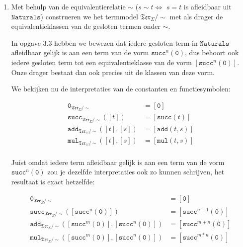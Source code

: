 \documentclass[a4paper,11pt]{article}
\begin{document}
\begin{enumerate}

\item %

Met behulp van de equivalentierelatie $\sim$ ($s \sim t \Leftrightarrow$ $s =
t$ is afleidbaar uit $\texttt{Naturals}$) construeren we het termmodel
$\mathfrak{Ter}_{\Sigma}/\sim$ met als drager de equivalentieklassen van de
gesloten termen onder $\sim$.

In opgave 3.3 hebben we bewezen dat iedere gesloten term in
$\texttt{Naturals}$ afleidbaar gelijk is aan een term van de vorm
$\texttt{succ}^{n}(\texttt{0})$, dus behoort ook iedere gesloten term tot een
equivalentieklasse van de vorm $[\texttt{succ}^{n}(\texttt{0})]$. Onze drager
bestaat dan ook precies uit de klassen van deze vorm.

We bekijken nu de interpretaties van de constanten en functiesymbolen:

\begin{align*}
\texttt{0}_{\mathfrak{Ter}_{\Sigma}/\sim}            &= [\texttt{0}] \\
\texttt{succ}_{\mathfrak{Ter}_{\Sigma}/\sim}([t])    &= [\texttt{succ}(t)] \\
\texttt{add}_{\mathfrak{Ter}_{\Sigma}/\sim}([t],[s]) &= [\texttt{add}(t,s)] \\
\texttt{mul}_{\mathfrak{Ter}_{\Sigma}/\sim}([t],[s]) &= [\texttt{mul}(t,s)] \\
\end{align*}

Juist omdat iedere term afleidbaar gelijk is aan een term van de vorm
$\texttt{succ}^{n}(\texttt{0})$ zou je dezelfde interpretaties ook zo kunnen
schrijven, het resultaat is exact hetzelfde:

\begin{align*}
\texttt{0}_{\mathfrak{Ter}_{\Sigma}/\sim}
  &= [\texttt{0}] \\
\texttt{succ}_{\mathfrak{Ter}_{\Sigma}/\sim}([\texttt{succ}^{n}(\texttt{0})])
  &= [\texttt{succ}^{n+1}(\texttt{0})] \\
\texttt{add}_{\mathfrak{Ter}_{\Sigma}/\sim}([\texttt{succ}^{m}(\texttt{0})],[\texttt{succ}^{n}(\texttt{0})])
  &= [\texttt{succ}^{m+n}(\texttt{0})] \\
\texttt{mul}_{\mathfrak{Ter}_{\Sigma}/\sim}([\texttt{succ}^{m}(\texttt{0})],[\texttt{succ}^{n}(\texttt{0})])
  &= [\texttt{succ}^{m*n}(\texttt{0})]
\end{align*}


\end{enumerate}
\end{document}
